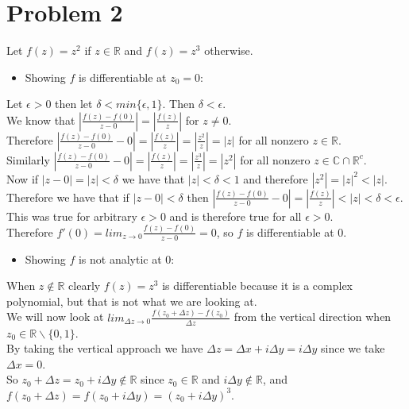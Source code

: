 \documentclass{article}
\begin{document}
\section*{Problem 2}
\begin{center}
    \doublespacing
    Let $f(z) = z^2$ if $z\in\mathbb{R}$ and $f(z) = z^3$ otherwise.
    \begin{itemize}
        \item Showing $f$ is differentiable at $z_0 = 0$:
    \end{itemize}
    Let $\epsilon > 0$ then let $\delta < min\{\epsilon, 1\}$. Then $\delta <\epsilon$.
    \\We know that $|\frac{f(z) - f(0)}{z - 0}| = |\frac{f(z)}{z}|$ for $z\neq 0$.
    \\Therefore $|\frac{f(z) - f(0)}{z - 0} - 0| = |\frac{f(z)}{z}| = |\frac{z^2}{z}| = |z|$ for all nonzero $z\in\mathbb{R}$.
    \\Similarly $|\frac{f(z) - f(0)}{z - 0} - 0| = |\frac{f(z)}{z}| = |\frac{z^3}{z}| = |z^2|$ for all nonzero $z\in\mathbb{C}\cap\mathbb{R}^c$.
    \\Now if $|z - 0| = |z| <\delta$ we have that $|z| <\delta < 1$ and therefore $|z^2| = |z|^2 < |z|$.
    \\Therefore we have that if $|z - 0| <\delta$ then $|\frac{f(z) - f(0)}{z - 0} - 0| = |\frac{f(z)}{z}| < |z| <\delta <\epsilon$.
    \\This was true for arbitrary $\epsilon > 0$ and is therefore true for all $\epsilon > 0$.
    \\Therefore $f'(0) = lim _{z\rightarrow 0}\frac{f(z) - f(0)}{z - 0} = 0$, so $f$ is differentiable at 0.
    \begin{itemize}
        \item Showing $f$ is not analytic at 0:
    \end{itemize}
    When $z\notin\mathbb{R}$ clearly $f(z) = z^3$ is differentiable because it is a complex polynomial, but that is not what we are looking at.
    \\We will now look at $lim_{\Delta z\rightarrow 0}\frac{f(z_0 +\Delta z) - f(z_0)}{\Delta z}$ from the vertical direction when $z_0\in\mathbb{R}\backslash\{0, 1\}$.
    \\By taking the vertical approach we have $\Delta z =\Delta x + i\Delta y = i\Delta y$ since we take $\Delta x = 0$.
    \\So $z_0 +\Delta z = z_0 + i\Delta y\notin\mathbb{R}$ since $z_0\in\mathbb{R}$ and $i\Delta y\notin\mathbb{R}$, and $f(z_0 +\Delta z) = f(z_0 + i\Delta y) = (z_0 + i\Delta y)^3$.

\end{center}
\end{document}
